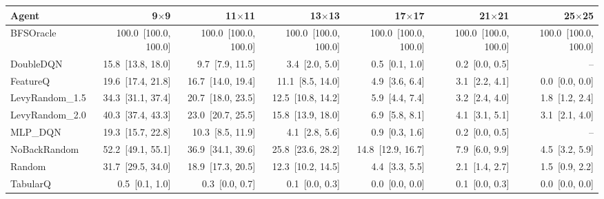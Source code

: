 \begin{tabular}{lrrrrrr}
\toprule
Agent & 9$\times$9 & 11$\times$11 & 13$\times$13 & 17$\times$17 & 21$\times$21 & 25$\times$25 \\
\midrule
BFSOracle & 100.0~[100.0, 100.0] & 100.0~[100.0, 100.0] & 100.0~[100.0, 100.0] & 100.0~[100.0, 100.0] & 100.0~[100.0, 100.0] & 100.0~[100.0, 100.0] \\
DoubleDQN & 15.8~[13.8, 18.0] & 9.7~[7.9, 11.5] & 3.4~[2.0, 5.0] & 0.5~[0.1, 1.0] & 0.2~[0.0, 0.5] & -- \\
FeatureQ & 19.6~[17.4, 21.8] & 16.7~[14.0, 19.4] & 11.1~[8.5, 14.0] & 4.9~[3.6, 6.4] & 3.1~[2.2, 4.1] & 0.0~[0.0, 0.0] \\
LevyRandom_1.5 & 34.3~[31.1, 37.4] & 20.7~[18.0, 23.5] & 12.5~[10.8, 14.2] & 5.9~[4.4, 7.4] & 3.2~[2.4, 4.0] & 1.8~[1.2, 2.4] \\
LevyRandom_2.0 & 40.3~[37.4, 43.3] & 23.0~[20.7, 25.5] & 15.8~[13.9, 18.0] & 6.9~[5.8, 8.1] & 4.1~[3.1, 5.1] & 3.1~[2.1, 4.0] \\
MLP_DQN & 19.3~[15.7, 22.8] & 10.3~[8.5, 11.9] & 4.1~[2.8, 5.6] & 0.9~[0.3, 1.6] & 0.2~[0.0, 0.5] & -- \\
NoBackRandom & 52.2~[49.1, 55.1] & 36.9~[34.1, 39.6] & 25.8~[23.6, 28.2] & 14.8~[12.9, 16.7] & 7.9~[6.0, 9.9] & 4.5~[3.2, 5.9] \\
Random & 31.7~[29.5, 34.0] & 18.9~[17.3, 20.5] & 12.3~[10.2, 14.5] & 4.4~[3.3, 5.5] & 2.1~[1.4, 2.7] & 1.5~[0.9, 2.2] \\
TabularQ & 0.5~[0.1, 1.0] & 0.3~[0.0, 0.7] & 0.1~[0.0, 0.3] & 0.0~[0.0, 0.0] & 0.1~[0.0, 0.3] & 0.0~[0.0, 0.0] \\
\bottomrule
\end{tabular}